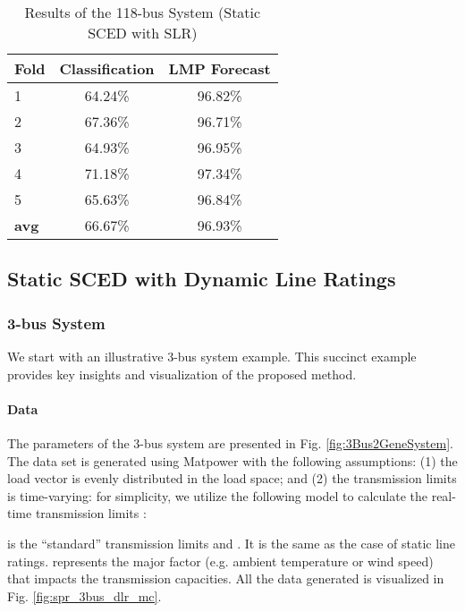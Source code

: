 \documentclass[letterpaper, 11pt]{article}
\theoremstyle{plain}
\theoremstyle{definition}
\begin{document}
\begin{table}[htbp]
  \caption{Results of the 118-bus System (Static SCED with SLR)}
  \label{tab:classification_accuracy_118bus}
  \centering

  \begin{tabular}{l|cc}
  \hline

  \hline
  \textbf{Fold} & \textbf{Classification} & \textbf{LMP Forecast} \\
  \hline
    1 & 64.24\% & 96.82\% \\
    2 & 67.36\% & 96.71\% \\
    3 & 64.93\% & 96.95\% \\
    4 & 71.18\% & 97.34\% \\
    5 & 65.63\% & 96.84\% \\
  \hline
  \textbf{avg} & 66.67\% & 96.93\% \\
  \hline

  \hline
  \end{tabular}
\end{table}



\subsection{Static SCED with Dynamic Line Ratings} \label{sub:case_study_dlr}
\subsubsection{3-bus System} \label{ssub:3_bus_system_dlr}
We start with an illustrative 3-bus system example. This succinct example provides key insights and visualization of the proposed method.

\paragraph{Data} \label{par:3bus_data}
The parameters of the 3-bus system are presented in Fig. \ref{fig:3Bus2GeneSystem}.
The data set is generated using Matpower with the following assumptions: 
(1) the load vector is evenly distributed in the load space;
and (2) the transmission limits  is time-varying: for simplicity, we utilize the following model to calculate the real-time transmission limits :

 is the ``standard'' transmission limits and . It is the same as the case of static line ratings.  
 represents the major factor (e.g. ambient temperature or wind speed) that impacts the transmission capacities. All the data generated is visualized in Fig. \ref{fig:spr_3bus_dlr_mc}.
\end{document}
